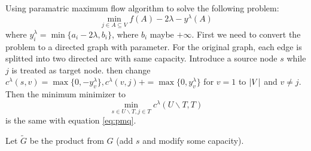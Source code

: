 \documentclass{article}
\begin{document}
Using paramatric maximum flow algorithm to solve the following problem:
\begin{equation}\label{eq:pmq}
\min_{j \in A \subseteq V} f(A) - 2\lambda - y^{\lambda}(A)
\end{equation}
where
$y^{\lambda}_i = \min\{a_i - 2\lambda, b_i\}$, where $b_i$ maybe $+\infty$.
First we need to convert the problem to a directed graph with parameter.
For the original graph, each edge is splitted into two directed arc with same capacity.
Introduce a source node $s$ while $j$ is treated as target node.  then change
$c^{\lambda}(s,v)=\max\{0, -y^{\lambda}_v\}, c^{\lambda}(v,j) += \max\{0, y^{\lambda}_v\}$ for $ v=1 $ to $\lvert V\rvert$ and $v \neq  j$. Then the minimum minimizer to 
\begin{equation}\label{eq:pmqe}
\min_{s\in U\backslash T, j\in T}c^{\lambda}(U\backslash T, T)
\end{equation}
is the same with equation \eqref{eq:pmq}.

Let $\widetilde{G}$ be the product from $G$ (add $s$ and modify some capacity). 
\end{document}
